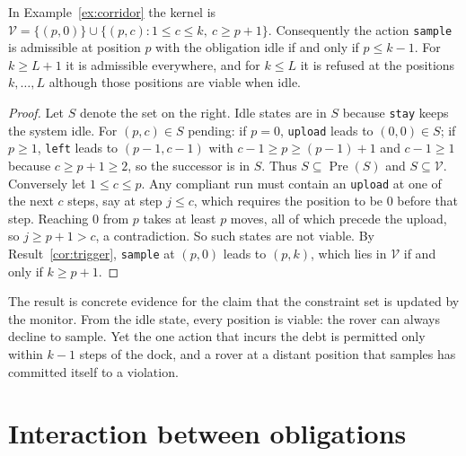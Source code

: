\begin{newresult}\label{prop:corridor}
In Example~\ref{ex:corridor} the kernel is $\mathcal V=\{(p,0)\}\cup\{(p,c):1\le c\le k,\ c\ge p+1\}$. Consequently the action \texttt{sample} is admissible at position $p$ with the obligation idle if and only if $p\le k-1$. For $k\ge L+1$ it is admissible everywhere, and for $k\le L$ it is refused at the positions $k,\dots,L$ although those positions are viable when idle.
\end{newresult}
\begin{proof}
Let $S$ denote the set on the right. Idle states are in $S$ because \texttt{stay} keeps the system idle. For $(p,c)\in S$ pending: if $p=0$, \texttt{upload} leads to $(0,0)\in S$; if $p\ge1$, \texttt{left} leads to $(p-1,c-1)$ with $c-1\ge p\ge(p-1)+1$ and $c-1\ge1$ because $c\ge p+1\ge2$, so the successor is in $S$. Thus $S\subseteq\operatorname{Pre}(S)$ and $S\subseteq\mathcal V$. Conversely let $1\le c\le p$. Any compliant run must contain an \texttt{upload} at one of the next $c$ steps, say at step $j\le c$, which requires the position to be $0$ before that step. Reaching $0$ from $p$ takes at least $p$ moves, all of which precede the upload, so $j\ge p+1>c$, a contradiction. So such states are not viable. By Result~\ref{cor:trigger}, \texttt{sample} at $(p,0)$ leads to $(p,k)$, which lies in $\mathcal V$ if and only if $k\ge p+1$.
\end{proof}

The result is concrete evidence for the claim that the constraint set is updated by the monitor. From the idle state, every position is viable: the rover can always decline to sample. Yet the one action that incurs the debt is permitted only within $k-1$ steps of the dock, and a rover at a distant position that samples has committed itself to a violation.

\section{Interaction between obligations}

